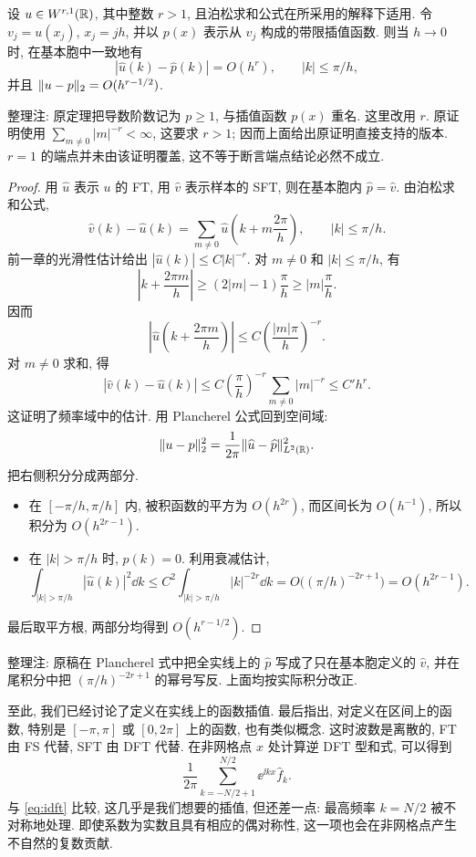 \begin{theorem}[带限插值的误差]\label{thm:bandlimited-interpolation-error}
设 $u\in W^{r,1}(\mathbb R)$, 其中整数 $r>1$, 且泊松求和公式在所采用的解释下适用. 令 $v_j=u(x_j)$, $x_j=jh$, 并以 $p(x)$ 表示从 $v_j$ 构成的带限插值函数. 则当 $h\to0$ 时, 在基本胞中一致地有
\[
|\widehat u(k)-\widehat p(k)|=O(h^r),\qquad |k|\le\pi/h,
\]
并且 $\lVert u-p\rVert_2=O(h^{r-1/2})$.
\end{theorem}
\begin{remark}
整理注: 原定理把导数阶数记为 $p\ge1$, 与插值函数 $p(x)$ 重名. 这里改用 $r$. 原证明使用 $\sum_{m\ne0}|m|^{-r}<\infty$, 这要求 $r>1$; 因而上面给出原证明直接支持的版本. $r=1$ 的端点并未由该证明覆盖, 这不等于断言端点结论必然不成立.
\end{remark}
\begin{proof}
用 $\widehat u$ 表示 $u$ 的 FT, 用 $\widehat v$ 表示样本的 SFT, 则在基本胞内 $\widehat p=\widehat v$. 由泊松求和公式,
\[
\widehat v(k)-\widehat u(k)=\sum_{m\ne0}
\widehat u\!\left(k+m\frac{2\pi}h\right),\qquad |k|\le\pi/h.
\]
前一章的光滑性估计给出 $|\widehat u(k)|\le C|k|^{-r}$. 对 $m\ne0$ 和 $|k|\le\pi/h$, 有
\[
\left|k+\frac{2\pi m}h\right|
\ge(2|m|-1)\frac\pi h\ge|m|\frac\pi h.
\]
因而
\[
\left|\widehat u\!\left(k+\frac{2\pi m}h\right)\right|
\le C\left(\frac{|m|\pi}h\right)^{-r}.
\]
对 $m\ne0$ 求和, 得
\[
|\widehat v(k)-\widehat u(k)|
\le C\left(\frac\pi h\right)^{-r}\sum_{m\ne0}|m|^{-r}
\le C'h^r.
\]
这证明了频率域中的估计. 用 Plancherel 公式回到空间域:
\[
\lVert u-p\rVert_2^2=\frac1{2\pi}\lVert \widehat u-\widehat p\rVert_{L^2(\mathbb R)}^2.
\]
把右侧积分分成两部分.
\begin{itemize}
\item 在 $[-\pi/h,\pi/h]$ 内, 被积函数的平方为 $O(h^{2r})$, 而区间长为 $O(h^{-1})$, 所以积分为 $O(h^{2r-1})$.
\item 在 $|k|>\pi/h$ 时, $\widehat p(k)=0$. 利用衰减估计,
\[
\int_{|k|>\pi/h}|\widehat u(k)|^2\dd k
\le C^2\int_{|k|>\pi/h}|k|^{-2r}\dd k
=O\bigl((\pi/h)^{-2r+1}\bigr)=O(h^{2r-1}).
\]
\end{itemize}
最后取平方根, 两部分均得到 $O(h^{r-1/2})$.
\end{proof}
\begin{remark}
整理注: 原稿在 Plancherel 式中把全实线上的 $\widehat p$ 写成了只在基本胞定义的 $\widehat v$, 并在尾积分中把 $(\pi/h)^{-2r+1}$ 的幂号写反. 上面均按实际积分改正.
\end{remark}

至此, 我们已经讨论了定义在实线上的函数插值. 最后指出, 对定义在区间上的函数, 特别是 $[-\pi,\pi]$ 或 $[0,2\pi]$ 上的函数, 也有类似概念. 这时波数是离散的, FT 由 FS 代替, SFT 由 DFT 代替. 在非网格点 $x$ 处计算逆 DFT 型和式, 可以得到
\[
\frac1{2\pi}\sum_{k=-N/2+1}^{N/2}\ee^{\ii kx}\widehat f_k.
\]
与 \eqref{eq:idft} 比较, 这几乎是我们想要的插值, 但还差一点: 最高频率 $k=N/2$ 被不对称地处理. 即使系数为实数且具有相应的偶对称性, 这一项也会在非网格点产生不自然的复数贡献.

